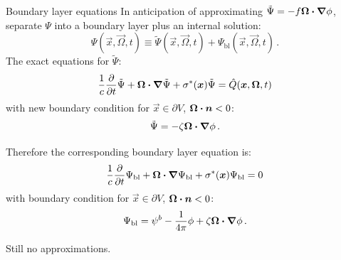 \documentclass{beamer}
\begin{document}
\begin{frame}{Boundary layer equations}
In anticipation of approximating $\tilde \Psi = - f \bm{\Omega}\bm{\cdot} \bm{\nabla} \phi$,
separate $\Psi$ into a boundary layer plus an internal solution:
\begin{equation*}
  \Psi(\vec{x}, \vec{\Omega}, t)
  \equiv \tilde \Psi(\vec{x}, \vec{\Omega}, t)
  + \Psi_\mathrm{bl}(\vec{x}, \vec{\Omega}, t)\,.
\end{equation*}
The exact equations for $\tilde \Psi$:
\begin{equation*}
  \frac{1}{c} \frac{\partial }{\partial t} \tilde\Psi
   + \bm{\Omega}\bm{\cdot} \bm{\nabla} \tilde\Psi
   + \sigma^\ast(\bm{x}) \tilde\Psi
  =  \hat Q(\bm{x}, \bm{\Omega}, t)
\end{equation*}
with new boundary condition for $\vec{x} \in \partial V$, $\bm{\Omega}\bm{\cdot}
\bm{n} < 0$:
\begin{equation*}
  \tilde\Psi = -\zeta \bm{\Omega}\bm{\cdot} \bm{\nabla} \phi\,.
\end{equation*}

Therefore the corresponding boundary layer equation is:
\begin{equation*}
  \frac{1}{c} \frac{\partial }{\partial t} \Psi_\mathrm{bl}
   + \bm{\Omega}\bm{\cdot} \bm{\nabla} \Psi_\mathrm{bl}
   + \sigma^\ast(\bm{x}) \Psi_\mathrm{bl}
  = 0
\end{equation*}
with boundary condition for $\vec{x} \in \partial V$, $\bm{\Omega}\bm{\cdot}
\bm{n} < 0$:
\begin{equation*}
  \Psi_\mathrm{bl} = \psi^b - \frac{1}{4\pi} \phi + \zeta \bm{\Omega}\bm{\cdot} \bm{\nabla}
  \phi \,.
\end{equation*}

{\small Still no approximations.}
\end{frame}
\end{document}
